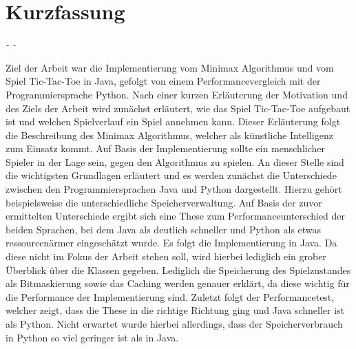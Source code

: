 \chapter*{Kurzfassung}

\begin{flushright}
    \textit{\DerAutorDerArbeit - \DieMatrikelnummer - \DieKursbezeichnung}
\end{flushright}

\textbf{\DerTitelDerArbeit}

Ziel der Arbeit war die Implementierung vom Minimax Algorithmus und vom Spiel Tic-Tac-Toe in Java,
gefolgt von einem Performancevergleich mit der Programmiersprache Python. Nach einer kurzen Erläuterung
der Motivation und des Ziels der Arbeit wird zunächst erläutert, wie das Spiel Tic-Tac-Toe
aufgebaut ist und welchen Spielverlauf ein Spiel annehmen kann. Dieser Erläuterung folgt die
Beschreibung des Minimax Algorithmus, welcher als künstliche Intelligenz zum Einsatz kommt.
Auf Basis der Implementierung sollte ein menschlicher Spieler in der Lage sein, gegen den
Algorithmus zu spielen. An dieser Stelle sind die wichtigsten Grundlagen erläutert und es werden 
zunächst die Unterschiede zwischen den Programmiersprachen Java und Python dargestellt. Hierzu gehört
beispielsweise die unterschiedliche Speicherverwaltung. Auf Basis der zuvor ermittelten Unterschiede
ergibt sich eine These zum Performanceunterschied der beiden Sprachen, bei dem Java als deutlich 
schneller und Python als etwas ressourcenärmer eingeschätzt wurde. Es folgt die Implementierung in Java. 
Da diese nicht im Fokus der Arbeit stehen soll, wird hierbei lediglich ein grober Überblick über die 
Klassen gegeben. Lediglich die Speicherung des Spielzustandes als Bitmaskierung sowie das Caching werden
genauer erklärt, da diese wichtig für die Performance der Implementierung sind. Zuletzt folgt der
Performancetest, welcher zeigt, dass die These in die richtige Richtung ging und Java schneller ist als
Python. Nicht erwartet wurde hierbei allerdings, dass der Speicherverbrauch in Python so viel geringer 
ist als in Java.


